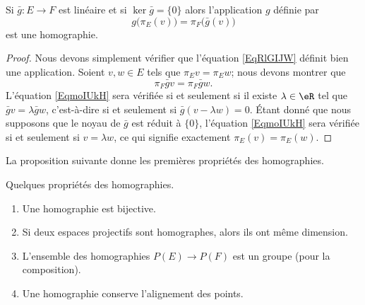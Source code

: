 \begin{lemma}
	Si \( \bar g\colon E\to F\) est linéaire et si \( \ker\bar g=\{ 0 \}\) alors l'application \( g\) définie par
	\begin{equation}        \label{EqRlGIJW}
		g\big( \pi_E(v) \big)=\pi_F\big( \bar g(v) \big)
	\end{equation}
	est une homographie.
\end{lemma}

\begin{proof}
	Nous devons simplement vérifier que l'équation \eqref{EqRlGIJW} définit bien une application. Soient \( v,w\in E\) tels que \( \pi_Ev=\pi_Ew\); nous devons montrer que
	\begin{equation}        \label{EqmoIUkH}
		\pi_F\bar gv=\pi_F\bar gw.
	\end{equation}
	L'équation \eqref{EqmoIUkH} sera vérifiée si et seulement si il existe \( \lambda\in\eR\) tel que \( \bar gv=\lambda\bar gw\), c'est-à-dire si et seulement si \( \bar g(v-\lambda w)=0\). Étant donné que nous supposons que le noyau de \( \bar g\) est réduit à \( \{ 0 \}\), l'équation \eqref{EqmoIUkH} sera vérifiée si et seulement si \( v=\lambda w\), ce qui signifie exactement \( \pi_E(v)=\pi_E(w)\).
\end{proof}

La proposition suivante donne les premières propriétés des homographies.
\begin{proposition}     \label{PROPooGVYXooDIiIbW}
	Quelques propriétés des homographies.
	\begin{enumerate}
		\item       \label{ITEMooTIONooSKjfny}
		      Une homographie est bijective.
		\item
		      Si deux espaces projectifs sont homographes, alors ils ont même dimension.
		\item       \label{ITEMooIZAPooNxEigb}
		      L'ensemble des homographies \( P(E)\to P(F)\) est un groupe (pour la composition).
		\item
		      Une homographie conserve l'alignement des points.
	\end{enumerate}
\end{proposition}

